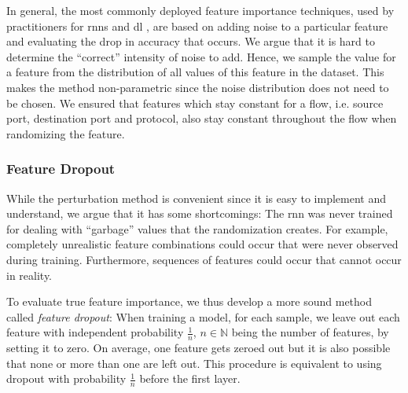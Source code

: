 \documentclass[conference]{IEEEtran}
\begin{document}
 In general, the most commonly deployed feature importance techniques, used by practitioners for \glspl{rnn} \cite{stackexchange_cross_validated_neural_2019} and \gls{dl} \cite{molnar_interpretable_2019,stackexchange_cross_validated_feature_2016,olden_accurate_2004}, are based on adding noise to a particular feature and evaluating the drop in accuracy that occurs. We argue that it is hard to determine the ``correct'' intensity of noise to add. %
 Hence, we sample the value for a feature from the distribution of all values of this feature in the dataset. This makes the method non-parametric since the noise distribution  does not need to be chosen. We ensured that features which stay constant for a flow, i.e. source port, destination port and protocol, also stay constant throughout the flow when randomizing the feature.


\subsubsection{Feature Dropout}
While the perturbation method %
is convenient since it is easy to implement and understand, we argue that it has some shortcomings:
The \gls{rnn} was never trained for dealing with ``garbage'' values that the randomization creates. For example, completely unrealistic feature combinations could occur that were never observed during training. Furthermore, sequences of features could occur that cannot occur in reality.


To evaluate true feature importance, we thus develop a more sound method %
called \textit{feature dropout}: When training a model, for each sample, we leave out each feature  with independent probability $\frac{1}{n}$, $n \in \mathbb N$ being the number of features, by setting it to zero. On average, one feature gets zeroed out but it is also possible that none or more than one are left out. This procedure is equivalent to using dropout \cite{srivastava_dropout:_2014} with probability $\frac{1}{n}$ before the first layer.
\end{document}
